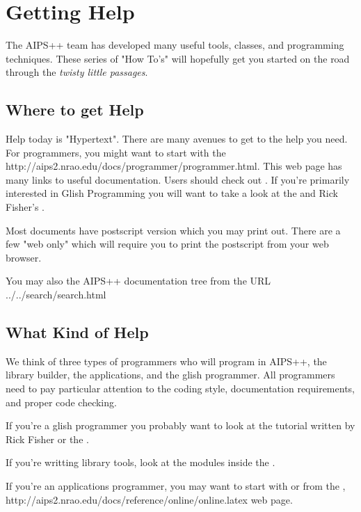 \chapter{Getting Help}

The AIPS++ team has developed many useful tools, classes, and programming
techniques.  These series of "How To's"
will hopefully get you started on the road through the \textit{twisty little
passages}. 

\section{Where to get Help}
Help today is "Hypertext". There are many avenues to get to the help
you need.  For programmers, you might want to start with the 
http://aips2.nrao.edu/docs/programmer/programmer.html.
This web page has many links to useful documentation. Users should check
out \textbf{}.  If you're primarily interested in
Glish Programming you will want to take a look at the \textbf{} and Rick Fisher's \textbf{}.

Most documents have postscript version which you may print out.  There are
a few "web only" which will require you to print the postscript from your
web browser.  

You may also  the
AIPS++ documentation tree from the URL 
{../../search/search.html}
\section{What Kind of Help}
We think of three types of programmers who will program in AIPS++,
the library builder, the applications, and the glish programmer.
All programmers need to pay particular attention to the coding
style, documentation requirements, and proper code checking.

If you're a glish programmer you probably want to look at the 
tutorial written by Rick Fisher or the \textbf{}.

If you're writting library tools, look at the modules inside the
.

If you're an applications programmer, you may want to start with
\textbf{}
or from the 
,
http://aips2.nrao.edu/docs/reference/online/online.latex web page.
